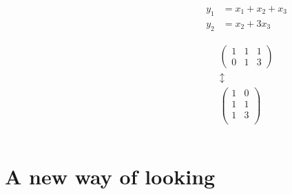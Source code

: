 \documentclass[10pt]{beamer}
\begin{document}
\begin{frame}
\begin{columns}
\begin{column}{0.6\textwidth}
      \end{column}
      \begin{column}{0.4\textwidth}
        \begin{align*}
          y_1 &= x_1 + x_2 + x_3\\
          y_2 &= x_2 + 3x_3
        \end{align*}

        \Large
        \begin{gather*}
          \begin{pmatrix}
            1 & 1 & 1\\
            0 & 1 & 3
          \end{pmatrix}\\
          \updownarrow\\
          \begin{pmatrix}
            1 & 0\\
            1 & 1\\
            1 & 3\\
          \end{pmatrix}
        \end{gather*}
      \end{column}
    \end{columns}
\end{frame}


\section{A new way of looking}
\end{document}
